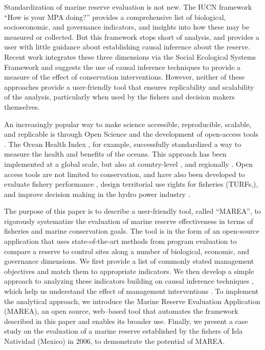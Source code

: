 \documentclass[10pt,letterpaper]{article}
\begin{document}
Standardization of marine reserve evaluation is not new. The IUCN framework ``How is your MPA doing?'' \cite{pomeroy_2005-Py,pomeroy_2004-23} provides a comprehensive list of biological, socioeconomic, and governance indicators, and insights into how these may be measured or collected. But this framework stops short of analysis, and provides a user with little guidance about establishing causal inference about the reserve. Recent work \cite{mascia_2017-m_} integrates these three dimensions via the Social Ecological Systems Framework \cite{ostrom_2009-hg,basurto_2013-oq} and suggests the use of causal inference techniques to provide a measure of the effect of conservation interventions. However, neither of these approaches provide a user-friendly tool that ensures replicability and scalability of the analysis, particularly when used by the fishers and decision makers themselves.

An increasingly popular way to make science accessible, reproducible, scalable, and replicable is through Open Science and the development of open-access tools \cite{lowndes_2017-xh}. The Ocean Health Index \cite{halpern_2012-k9,halpern_2017-Zi}, for example, successfully standardized a way to measure the health and benefits of the oceans. This approach has been implemented at a global scale, but also at country-level \cite{selig_2015-F9}, and regionally \cite{halpern_2014-lQ,elfes_2014-RC}. Open access tools are not limited to conservation, and have also been developed to evaluate fishery performance \cite{anderson_2015-ND,dowling_2016-pO}, design territorial use rights for fisheries (TURFs,\cite{oyanedel_2017-TO}), and improve decision making in the hydro power industry \cite{vilela_2017-Zo}.

The purpose of this paper is to describe a user-friendly tool, called ``MAREA'', to rigorously systematize the evaluation of marine reserve effectiveness in terms of fisheries and marine conservation goals. The tool is in the form of an open-source application that uses state-of-the-art methods from program evaluation to compare a reserve to control sites along a number of biological, economic, and governance dimensions. We first provide a list of commonly stated management objectives and match them to appropriate indicators. We then develop a simple approach to analyzing these indicators building on causal inference techniques \cite{moland_2013-VP}, which help us understand the effect of management interventions \cite{burgess_2018-HN,mascia_2017-m_}. To implement the analytical approach, we introduce the Marine Reserve Evaluation Application (MAREA), an open source, web–based tool that automates the framework described in this paper and enables its broader use. Finally, we present a case study on the evaluation of a marine reserve established by the fishers of Isla Natividad (Mexico) in 2006, to demonstrate the potential of MAREA.
\end{document}
